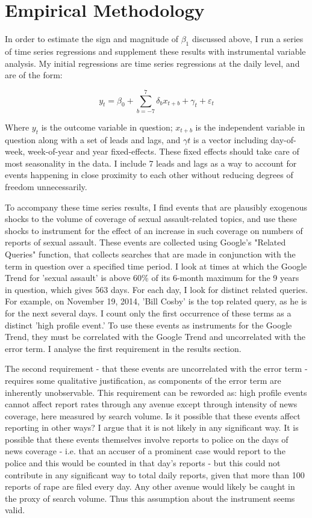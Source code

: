 \documentclass[AER,draftmode]{AEA}
\begin{document}
\section{Empirical Methodology}

In order to estimate the sign and magnitude of $\beta_1$ discussed above, I run a series of time series regressions and supplement these results with instrumental variable analysis. My initial regressions are time series regressions at the daily level, and are of the form: 

$$ 
y_{t} = \beta_{0} + \sum_{b=-7}^{7} \delta_{b} x_{t+b} + \gamma_{t} + \varepsilon_{t}
$$

Where $y_{t}$ is the outcome variable in question; $x_{t+b}$ is the independent variable in question along with a set of leads and lags, and $\gamma{t}$ is a vector including day-of-week, week-of-year and year fixed-effects. These fixed effects should take care of most seasonality in the data. I include 7 leads and lags as a way to account for events happening in close proximity to each other without reducing degrees of freedom unnecessarily.

To accompany these time series results, I find events that are plausibly exogenous shocks to the volume of coverage of sexual assault-related topics, and use these shocks to instrument for the effect of an increase in such coverage on numbers of reports of sexual assault. These events are collected using Google's "Related Queries" function, that collects searches that are made in conjunction with the term in question over a specified time period. I look at times at which the Google Trend for 'sexual assault' is above 60\% of its 6-month maximum for the 9 years in question, which gives 563 days. For each day, I look for distinct related queries. For example, on November 19, 2014, 'Bill Cosby' is the top related query, as he is for the next several days. I count only the first occurrence of these terms as a distinct 'high profile event.' To use these events as instruments for the Google Trend, they must be correlated with the Google Trend and uncorrelated with the error term. I analyse the first requirement in the results section. 

The second requirement - that these events are uncorrelated with the error term - requires some qualitative justification, as components of the error term are inherently unobservable. This requirement can be reworded as: high profile events cannot affect report rates through any avenue except through intensity of news coverage, here measured by search volume. Is it possible that these events affect reporting in other ways? I argue that it is not likely in any significant way. It is possible that these events themselves involve reports to police on the days of news coverage - i.e. that an accuser of a prominent case would report to the police and this would be counted in that day's reports - but this could not contribute in any significant way to total daily reports, given that more than 100 reports of rape are filed every day. Any other avenue  would likely be caught in the proxy of search volume. Thus this assumption about the instrument seems valid.
\end{document}
